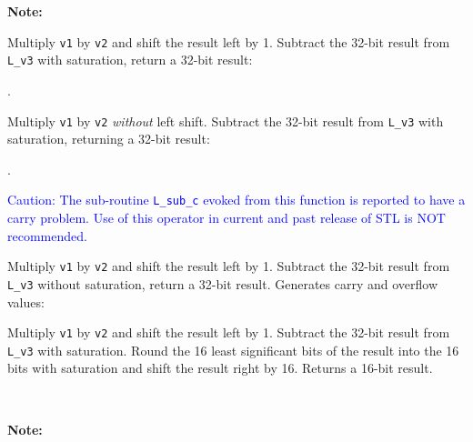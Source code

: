 \textbf{Note:} \hfill {}


Multiply {\tt v1} by {\tt v2} and shift the result left by 1. Subtract
the 32-bit result from {\tt L\_v3} with saturation, return a 32-bit
result:

.


Multiply {\tt v1} by {\tt v2} {\em without} left shift. Subtract the
32-bit result from {\tt L\_v3} with saturation, returning a 32-bit
result:

.


\textcolor{blue}{
%
  Caution: The sub-routine {\tt L\_sub\_c} evoked from this function
  is reported to have a carry problem. Use of this operator in current
  and past release of STL is NOT recommended.
%
}

Multiply {\tt v1} by {\tt v2} and shift the result left by 1. Subtract
the 32-bit result from {\tt L\_v3} without saturation, return a 32-bit
result. Generates carry and overflow values:




Multiply {\tt v1} by {\tt v2} and shift the result left by 1.
Subtract the 32-bit result from {\tt L\_v3} with saturation. Round
the 16 least significant bits of the result into the 16 bits with
saturation and shift the result right by 16. Returns a 16-bit
result.

\ \\

\textbf{Note:} \hfill {}

